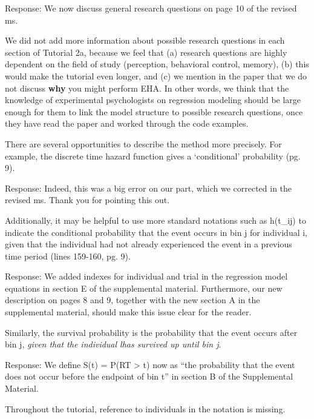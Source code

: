 \documentclass[
]{article}
\renewenvironment{quote}{\begin{leftbar}}{\end{leftbar}}
\begin{document}
Response: We now discuss general research questions on page 10 of the
revised ms.

We did not add more information about possible research questions in
each section of Tutorial 2a, because we feel that (a) research questions
are highly dependent on the field of study (perception, behavioral
control, memory), (b) this would make the tutorial even longer, and (c)
we mention in the paper that we do not discuss \textbf{why} you might
perform EHA. In other words, we think that the knowledge of experimental
psychologists on regression modeling should be large enough for them to
link the model structure to possible research questions, once they have
read the paper and worked through the code examples.

\begin{quote}
There are several opportunities to describe the method more precisely.
For example, the discrete time hazard function gives a `conditional'
probability (pg. 9).
\end{quote}

Response: Indeed, this was a big error on our part, which we corrected
in the revised ms. Thank you for pointing this out.

\begin{quote}
Additionally, it may be helpful to use more standard notations such as
h(t\_ij) to indicate the conditional probability that the event occurs
in bin j for individual i, given that the individual had not already
experienced the event in a previous time period (lines 159-160, pg. 9).
\end{quote}

Response: We added indexes for individual and trial in the regression
model equations in section E of the supplemental material. Furthermore,
our new description on pages 8 and 9, together with the new section A in
the supplemental material, should make this issue clear for the reader.

\begin{quote}
Similarly, the survival probability is the probability that the event
occurs after bin j, \emph{given that the individual lhas survived up
until bin j}.
\end{quote}

Response: We define S(t) = P(RT \textgreater{} t) now as ``the
probability that the event does not occur before the endpoint of bin t''
in section B of the Supplemental Material.

\begin{quote}
Throughout the tutorial, reference to individuals in the notation is
missing.
\end{quote}
\end{document}
